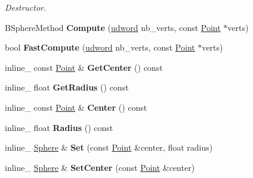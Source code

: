 \begin{DoxyCompactItemize}
\begin{DoxyCompactList}\small\item\em Destructor. \end{DoxyCompactList}\item 
B\+Sphere\+Method {\bfseries Compute} (\hyperlink{IceTypes_8h_a44c6f1920ba5551225fb534f9d1a1733}{udword} nb\+\_\+verts, const \hyperlink{classOpcode_1_1Point}{Point} $\ast$verts)\hypertarget{classOpcode_1_1Sphere_a6b1fd299a9af23a27457a0301f755552}{}\label{classOpcode_1_1Sphere_a6b1fd299a9af23a27457a0301f755552}

\item 
bool {\bfseries Fast\+Compute} (\hyperlink{IceTypes_8h_a44c6f1920ba5551225fb534f9d1a1733}{udword} nb\+\_\+verts, const \hyperlink{classOpcode_1_1Point}{Point} $\ast$verts)\hypertarget{classOpcode_1_1Sphere_a13f2536db38f1960538d31566cc65044}{}\label{classOpcode_1_1Sphere_a13f2536db38f1960538d31566cc65044}

\item 
inline\+\_\+ const \hyperlink{classOpcode_1_1Point}{Point} \& {\bfseries Get\+Center} () const \hypertarget{classOpcode_1_1Sphere_a802efc2390d5c56aab77f8dbaeb9dc47}{}\label{classOpcode_1_1Sphere_a802efc2390d5c56aab77f8dbaeb9dc47}

\item 
inline\+\_\+ float {\bfseries Get\+Radius} () const \hypertarget{classOpcode_1_1Sphere_aa556c833de47cc8773b5ae1cf7ffdaff}{}\label{classOpcode_1_1Sphere_aa556c833de47cc8773b5ae1cf7ffdaff}

\item 
inline\+\_\+ const \hyperlink{classOpcode_1_1Point}{Point} \& {\bfseries Center} () const \hypertarget{classOpcode_1_1Sphere_a3286ad0fd84d2e7d361f87cff939e864}{}\label{classOpcode_1_1Sphere_a3286ad0fd84d2e7d361f87cff939e864}

\item 
inline\+\_\+ float {\bfseries Radius} () const \hypertarget{classOpcode_1_1Sphere_ad18428ab8c3924cf164a551f0faf3683}{}\label{classOpcode_1_1Sphere_ad18428ab8c3924cf164a551f0faf3683}

\item 
inline\+\_\+ \hyperlink{classOpcode_1_1Sphere}{Sphere} \& {\bfseries Set} (const \hyperlink{classOpcode_1_1Point}{Point} \&center, float radius)\hypertarget{classOpcode_1_1Sphere_a52a3b5a15ab753331b446db22032410d}{}\label{classOpcode_1_1Sphere_a52a3b5a15ab753331b446db22032410d}

\item 
inline\+\_\+ \hyperlink{classOpcode_1_1Sphere}{Sphere} \& {\bfseries Set\+Center} (const \hyperlink{classOpcode_1_1Point}{Point} \&center)\hypertarget{classOpcode_1_1Sphere_a3fa8990ccef75c411363c4a9c60da982}{}\label{classOpcode_1_1Sphere_a3fa8990ccef75c411363c4a9c60da982}


\end{DoxyCompactItemize}
